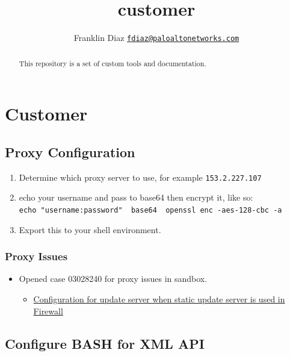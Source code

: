 \documentclass[
]{article}
\title{customer}
\author{Franklin Diaz
\href{mailto:fdiaz@paloaltonetworks.com}{\nolinkurl{fdiaz@paloaltonetworks.com}}}
\date{}
\providecommand{\tightlist}{%
  \setlength{\itemsep}{0pt}\setlength{\parskip}{0pt}}
\begin{document}
\maketitle
\begin{abstract}
This repository is a set of custom tools and documentation.
\end{abstract}

\hypertarget{customer}{%
\section{Customer}\label{customer}}

\hypertarget{proxy-configuration}{%
\subsection{Proxy Configuration}\label{proxy-configuration}}

\begin{enumerate}
\def\labelenumi{\arabic{enumi}.}
\tightlist
\item
  Determine which proxy server to use, for example
  \texttt{153.2.227.107}
\item
  echo your username and pass to base64 then encrypt it, like so:
  \texttt{echo\ "username:password"\ \textbar{}\ base64\ \textbar{}\ openssl\ enc\ -aes-128-cbc\ -a}
\item
  Export this to your shell environment.
\end{enumerate}

\hypertarget{proxy-issues}{%
\subsubsection{Proxy Issues}\label{proxy-issues}}

\begin{itemize}
\tightlist
\item
  Opened case 03028240 for proxy issues in sandbox.

  \begin{itemize}
  \tightlist
  \item
    \href{https://knowledgebase.paloaltonetworks.com/KCSArticleDetail?id=kA14u0000001UtRCAU}{Configuration
    for update server when static update server is used in Firewall}
  \end{itemize}
\end{itemize}

\hypertarget{configure-bash-for-xml-api}{%
\subsection{Configure BASH for XML
API}\label{configure-bash-for-xml-api}}
\end{document}
